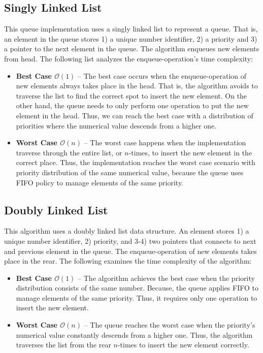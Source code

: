 \documentclass[a4paper,11pt]{kth-mag}
\begin{document}
\subsection{Singly Linked List}\label{sec:singly}
This queue implementation uses a singly linked list to represent a queue.
That is, an element in the queue stores 1) a unique number identifier, 2) a priority and 3) a pointer to the next element in the queue.
The algorithm enqueues new elements from head.
The following list analyzes the enqueue-operation's time complexity:
\begin{itemize}
    \item \textbf{Best Case $\mathcal{O}(1)$} -- The best case occurs when the enqueue-operation of new elements always takes place in the head.
        That is, the algorithm avoids to traverse the list to find the correct spot to insert the new element.
        On the other hand, the queue needs to only perform one operation to put the new element in the head.
        Thus, we can reach the best case with a distribution of priorities where the numerical value descends from a higher one.
    \item \textbf{Worst Case $\mathcal{O}(n)$} -- The worst case happens when the implementation traverse through the entire list, or $n$-times, to insert the new element in the correct place.
        Thus, the implementation reaches the worst case scenario with priority distribution of the same numerical value, because the queue uses FIFO policy to manage elements of the same priority.
\end{itemize}

\subsection{Doubly Linked List}
This algorithm uses a doubly linked list data structure.
An element stores 1) a unique number identifier, 2) priority, and 3-4) two pointers that connects to next and previous element in the queue.
The enqueue-operation of new elements takes place in the rear.
The following examines the time complexity of the algorithm:
\begin{itemize}
    \item \textbf{Best Case $\mathcal{O}(1)$} -- The algorithm achieves the best case when the priority distribution consists of the same number.
        Because, the queue applies FIFO to manage elements of the same priority.
        Thus, it requires only one operation to insert the new element.
    \item \textbf{Worst Case $\mathcal{O}(n)$} -- The queue reaches the worst case when the priority's numerical value constantly descends from a higher one.
        Thus, the algorithm traverses the list from the rear $n$-times to insert the new element correctly.
\end{itemize}
\end{document}
